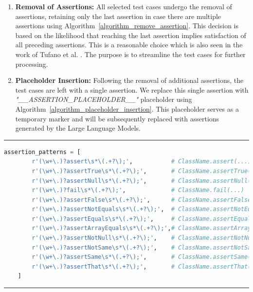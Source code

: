     \begin{enumerate}
        \item \textbf{Removal of Assertions:} All selected test cases undergo the removal of assertions, retaining only the last assertion in case there are multiple assertions using Algorithm~\ref{algorithm_remove_assertion}. This decision is based on the likelihood that reaching the last assertion implies satisfaction of all preceding assertions. This is a reasonable choice which is also seen in the work of Tufano et al. \cite{tufano_generating_2022}. The purpose is to streamline the test cases for further processing.

        \item \textbf{Placeholder Insertion:} Following the removal of additional assertions, the test cases are left with a single assertion. We replace this single assertion with \textit{"\_\_ASSERTION\_PLACEHOLDER\_\_"} placeholder using Algorithm~\ref{algorithm_placeholder_insertion}. This placeholder serves as a temporary marker and will be subsequently replaced with assertions generated by the Large Language Models.
    \end{enumerate}

    \hrule
    \begin{lstlisting}[language=Python, caption=Assertion selection Regex, label=assertions_regex]
    assertion_patterns = [
        r'(\w+\.)?assert\s*\(.+?\);',           # ClassName.assert(...)
        r'(\w+\.)?assertTrue\s*\(.+?\);',       # ClassName.assertTrue(...)
        r'(\w+\.)?assertNull\s*\(.+?\);',       # ClassName.assertNull(...)
        r'(\w+\.)?fail\s*\(.+?\);',             # ClassName.fail(...)
        r'(\w+\.)?assertFalse\s*\(.+?\);',      # ClassName.assertFalse(...)
        r'(\w+\.)?assertNotEquals\s*\(.+?\);',  # ClassName.assertNotEquals(...)
        r'(\w+\.)?assertEquals\s*\(.+?\);',     # ClassName.assertEquals(...)
        r'(\w+\.)?assertArrayEquals\s*\(.+?\);',# ClassName.assertArrayEquals(...)
        r'(\w+\.)?assertNotNull\s*\(.+?\);',    # ClassName.assertNotNull(...)
        r'(\w+\.)?assertNotSame\s*\(.+?\);',    # ClassName.assertNotSame(...)
        r'(\w+\.)?assertSame\s*\(.+?\);',       # ClassName.assertSame(...)
        r'(\w+\.)?assertThat\s*\(.+?\);',       # ClassName.assertThat(...)
    ]
    \end{lstlisting}
    \hrule
    
